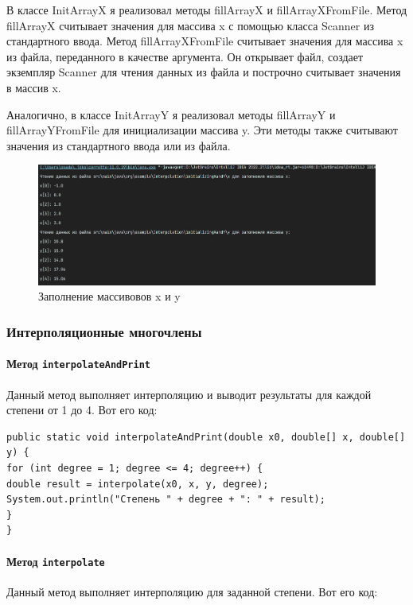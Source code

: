 \documentclass[12pt]{article}
\begin{document}
    В классе InitArrayX я реализовал методы fillArrayX и fillArrayXFromFile. Метод fillArrayX считывает значения для массива x с помощью класса Scanner из стандартного ввода. Метод fillArrayXFromFile считывает значения для массива x из файла, переданного в качестве аргумента. Он открывает файл, создает экземпляр Scanner для чтения данных из файла и построчно считывает значения в массив x.

    Аналогично, в классе InitArrayY я реализовал методы fillArrayY и fillArrayYFromFile для инициализации массива y. Эти методы также считывают значения из стандартного ввода или из файла.

    \begin{figure}[h]

        \centering

        \includegraphics[width=0.8\linewidth]{image/initXandY}

        \caption{Заполнение массивовов x и y}

        \label{fig:mpr}

    \end{figure}

    \subsubsection{Интерполяционные многочлены}

    \paragraph{Метод \texttt{interpolateAndPrint}}
    Данный метод выполняет интерполяцию и выводит результаты для каждой степени от 1 до 4. Вот его код:

    \begin{verbatim}
public static void interpolateAndPrint(double x0, double[] x, double[] y) {
for (int degree = 1; degree <= 4; degree++) {
double result = interpolate(x0, x, y, degree);
System.out.println("Степень " + degree + ": " + result);
}
}
    \end{verbatim}

    \paragraph{Метод \texttt{interpolate}}
    Данный метод выполняет интерполяцию для заданной степени. Вот его код:
\end{document}
